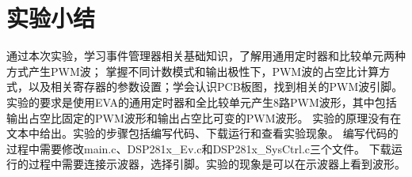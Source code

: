 \documentclass{math201}
\begin{document}
\section{实验小结}

通过本次实验，学习事件管理器相关基础知识，了解用通用定时器和比较单元两种方式产生PWM波；
掌握不同计数模式和输出极性下，PWM波的占空比计算方式，以及相关寄存器的参数设置；学会认识PCB板图，找到相关的PWM波引脚。
实验的要求是使用EVA的通用定时器和全比较单元产生8路PWM波形，其中包括输出占空比固定的PWM波形和输出占空比可变的PWM波形。
实验的原理没有在文本中给出。实验的步骤包括编写代码、下载运行和查看实验现象。
编写代码的过程中需要修改main.c、DSP281x\_Ev.c和DSP281x\_SysCtrl.c三个文件。
下载运行的过程中需要连接示波器，选择引脚。实验的现象是可以在示波器上看到波形。
\end{document}
